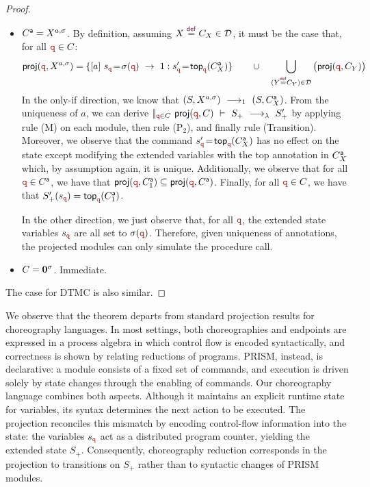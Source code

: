 \begin{proof}
\begin{itemize}
    \item ${C}^{\mathsf a}=X^{a,\sigma}$. By definition, assuming
      $X\defrec C_X\in \defin$, it must be the case that, for all
      $\nrr\in C$:
      \[\proj (\nrr, X^{a,\sigma}) = \{
        \commandBase {a} {s_{\nrr}\!=\! \sigma(\nrr)}{\ 1:
          s'_{\nrr}\!=\! } \mathsf{top}_{\nrr}(\anno
        C_X)\}\qquad\cup\quad\bigcup_{(Y\defrec
          C_Y)\in\defin}\big(\proj (\nrr, C_Y)\big)\]
      In the only-if direction, we know that
      $(S, X^{a,\sigma}) \ \longrightarrow_{1}\  (S, {C}^{\mathsf a}_X)$. From the uniqueness
      of $a$, we can derive
      $\pp_{\nrr\in C}\ \proj(\nrr, C)\ \vdash\ S_+ \red{\lambda}
      S_+'$ by applying rule (\textsf{M}) on each module, then rule
      (\textsf{P$_2$}), and finally rule (\textsf{Transition}).
      Moreover, we observe that the command
      $s'_{\nrr}\!=\!  \mathsf{top}_{\nrr}(\anno C_X)$ has no effect
      on the state except modifying the extended variables with the
      top annotation in ${C}^{\mathsf a}_X$ which, by assumption again, it is
      unique. Additionally, we observe that for all $\nrr\in \anno C$,
      we have that
      $\proj(\nrr, \anno C_1) \subseteq \proj(\nrr, \anno
      C)$. Finally, for all $\nrr\in C$, we have that
      $S_+'(s_{\nrr}) = \topannotation\nrr {\anno C_1}$.

      In the other direction, we just observe that, for all $\nrr$,
      the extended state variables $s_{\nrr}$ are all set to
      $\sigma(\nrr)$. Therefore, given uniqueness of annotations, the
      projected modules can only simulate the procedure call.


    \item $C=\mathbf{0}^\sigma$. Immediate.
    
  \end{itemize}
        The case for DTMC is also similar.

     
\end{proof}
We observe that the theorem departs from standard projection results
for choreography languages.  In most settings, both choreographies and
endpoints are expressed in a process algebra in which control flow is
encoded syntactically, and correctness is shown by relating reductions
of programs.  PRISM, instead, is declarative: a module consists of a
fixed set of commands, and execution is driven solely by state changes
through the enabling of commands.
%
Our choreography language combines both aspects.  Although it
maintains an explicit runtime state for variables, its syntax
determines the next action to be executed.  The projection reconciles
this mismatch by encoding control-flow information into the state: the
variables $s_{\nrr}$ act as a distributed program counter, yielding
the extended state $S_+$.
%
Consequently, choreography reduction corresponds in the projection to
transitions on $S_+$ rather than to syntactic changes of PRISM
modules.  
%




